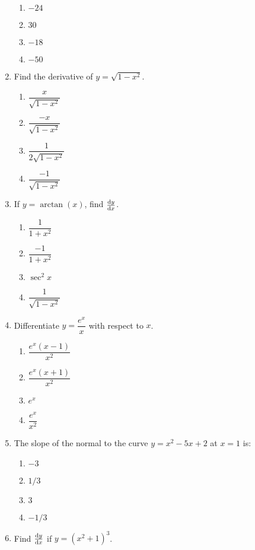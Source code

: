 \begin{multicols}{2}
\begin{enumerate}[label={\arabic*.}]
      \begin{enumerate}[label={\Alph*.}]
        \item \(-24\)
        \item \(30\)
        \item \(-18\)
        \item \(-50\)
      \end{enumerate}
    \item Find the derivative of \(y = \sqrt{1-x^2}\).
      \begin{enumerate}[label={\Alph*.}]
        \item \(\dfrac{x}{\sqrt{1-x^2}}\)
        \item \(\dfrac{-x}{\sqrt{1-x^2}}\)
        \item \(\dfrac{1}{2\sqrt{1-x^2}}\)
        \item \(\dfrac{-1}{\sqrt{1-x^2}}\)
      \end{enumerate}
    \item If \(y = \arctan(x)\), find \(\frac{\mathrm{d}y}{\mathrm{d}x}\).
      \begin{enumerate}[label={\Alph*.}]
        \item \(\dfrac{1}{1+x^2}\)
        \item \(\dfrac{-1}{1+x^2}\)
        \item \(\sec^2 x\)
        \item \(\dfrac{1}{\sqrt{1-x^2}}\)
      \end{enumerate}
    \item Differentiate \(y = \dfrac{e^x}{x}\) with respect to \(x\).
      \begin{enumerate}[label={\Alph*.}]
        \item \(\dfrac{e^x(x-1)}{x^2}\)
        \item \(\dfrac{e^x(x+1)}{x^2}\)
        \item \(e^x\)
        \item \(\dfrac{e^x}{x^2}\)
      \end{enumerate}
    \item The slope of the normal to the curve \(y = x^2 - 5x + 2\) at \(x=1\) is:
      \begin{enumerate}[label={\Alph*.}]
        \item \(-3\)
        \item \(1/3\)
        \item \(3\)
        \item \(-1/3\)
      \end{enumerate}
    \item Find \(\frac{\mathrm{d}y}{\mathrm{d}x}\) if \(y = {(x^2+1)}^3\).

\end{enumerate}
\end{multicols}
